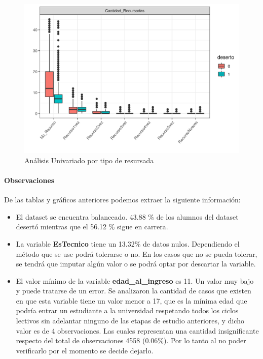 \begin{figure}[!htb]
	\centering
	\includegraphics{imagenes/imagenes/gg_explo_tablon_tipo_recur.png}
	\caption{Análisis Univariado por tipo de resursada}
	\label{fig:tablon_boxplot_tipoRecursada}
\end{figure}

\clearpage

\hypertarget{observaciones}{%
	\paragraph{Observaciones}\label{observaciones}}

De las tablas y gráficos anteriores podemos extraer la siguiente
información:

\begin{itemize}
	\item
	El dataset se encuentra balanceado. 43.88 \% de los alumnos del
	dataset desertó mientras que el 56.12 \% sigue en carrera.
	\item
	La variable \textbf{EsTecnico} tiene un 13.32\% de datos nulos.
	Dependiendo el método que se use podrá tolerarse o no. En los casos
	que no se pueda tolerar, se tendrá que imputar algún valor o se podrá
	optar por descartar la variable.
	\item
	El valor mínimo de la variable \textbf{edad\_al\_ingreso} es 11. Un
	valor muy bajo y puede tratarse de un error. Se analizaron la cantidad
	de casos que existen en que esta variable tiene un valor menor a 17,
	que es la mínima edad que podría entrar un estudiante a la universidad
	respetando todos los ciclos lectivos sin adelantar ninguno de las
	etapas de estudio anteriores, y dicho valor es de 4 observaciones. Las
	cuales representan una cantidad insignificante respecto del total de
	observaciones 4558 (0.06\%). Por lo tanto al no poder verificarlo por
	el momento se decide dejarlo.
\end{itemize}

